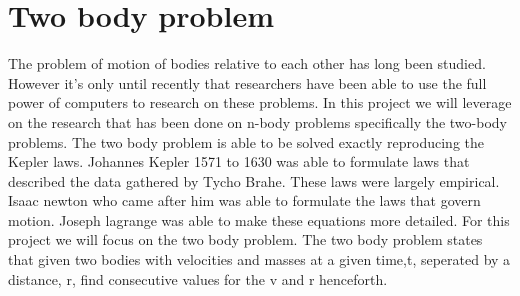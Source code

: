 \section{Two body problem}
The problem of motion of bodies relative to each other has long been studied. However it's only until recently that researchers have been able to use the full power of computers to research on these problems. In this project we will  leverage on the research that has been done on n-body problems specifically the two-body problems. The two body problem is able to be solved exactly reproducing the Kepler laws.
Johannes Kepler 1571 to 1630 was able to formulate laws that described the data gathered by Tycho Brahe. These laws were largely empirical. Isaac newton who came after him was able to formulate the laws that  govern motion. Joseph lagrange was able to make these equations more detailed. For this project we will focus on the two body problem. The two body problem states that given two bodies with velocities and masses at a given time,t, seperated by a distance, r, find consecutive values for the v and r henceforth.
